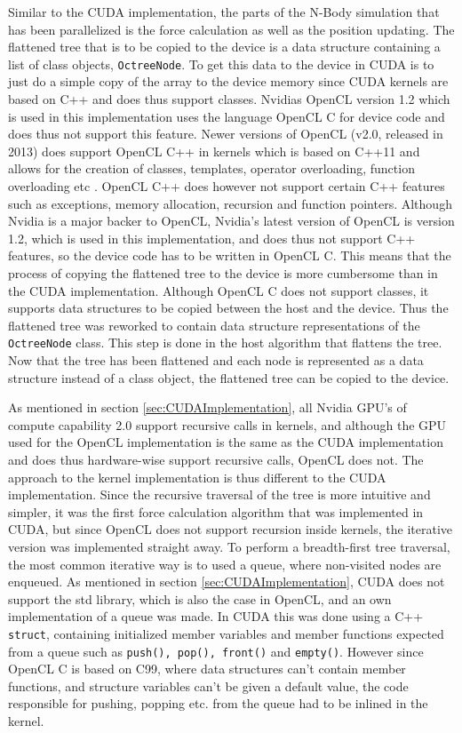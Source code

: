 Similar to the CUDA implementation, the parts of the N-Body simulation that has been parallelized is the force calculation as well as the position updating. The flattened tree that is to be copied to the device is a data structure containing a list of class objects, \lstinline{OctreeNode}. To get this data to the device in CUDA is to just do a simple copy of the array to the device memory since CUDA kernels are based on C++ and does thus support classes. Nvidias OpenCL version 1.2 which is used in this implementation uses the language OpenCL C for device code and does thus not support this feature. Newer versions of OpenCL (v2.0, released in 2013) does support OpenCL C++ in kernels which is based on C++11 and allows for the creation of classes, templates, operator overloading, function overloading etc \cite{OpenCLC++Introduction}. OpenCL C++ does however not support certain C++ features such as exceptions, memory allocation, recursion and function pointers. Although Nvidia is a major backer to OpenCL, Nvidia's latest version of OpenCL is version 1.2, which is used in this implementation, and does thus not support C++ features, so the device code has to be written in OpenCL C. This means that the process of copying the flattened tree to the device is more cumbersome than in the CUDA implementation. Although OpenCL C does not support classes, it supports data structures to be copied between the host and the device. Thus the flattened tree was reworked to contain data structure representations of the \lstinline{OctreeNode} class. This step is done in the host algorithm that flattens the tree. Now that the tree has been flattened and each node is represented as a data structure instead of a class object, the flattened tree can be copied to the device.

As mentioned in section \ref{sec:CUDAImplementation}, all Nvidia GPU's of compute capability 2.0 support recursive calls in kernels, and although the GPU used for the OpenCL implementation is the same as the CUDA implementation and does thus hardware-wise support recursive calls, OpenCL does not. The approach to the kernel implementation is thus different to the CUDA implementation. Since the recursive traversal of the tree is more intuitive and simpler, it was the first force calculation algorithm that was implemented in CUDA, but since OpenCL does not support recursion inside kernels, the iterative version was implemented straight away. To perform a breadth-first tree traversal, the most common iterative way is to used a queue, where non-visited nodes are enqueued. As mentioned in section \ref{sec:CUDAImplementation}, CUDA does not support the std library, which is also the case in OpenCL, and an own implementation of a queue was made. In CUDA this was done using a C++ \lstinline{struct}, containing initialized member variables and member functions expected from a queue such as \lstinline{push(), pop(), front()} and \lstinline{empty()}. However since OpenCL C is based on C99, where data structures can't contain member functions, and structure variables can't be given a default value, the code responsible for pushing, popping etc. from the queue had to be inlined in the kernel.


